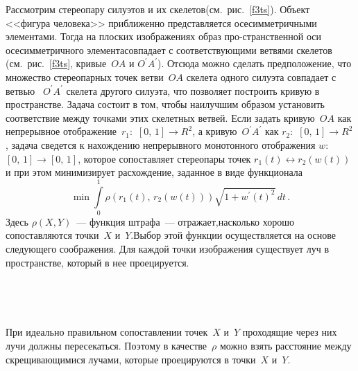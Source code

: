\begin{multicols}{2}
     Рассмотрим стереопару силуэтов и их скелетов\linebreak (см.\  рис.~\ref{f3ts}). 
Объект <<фигура человека>> прибли\-женно представляется осесимметричными 
элементами. Тогда на плоских изображениях образ про-\linebreak странственной оси 
осесимметричного элемента\linebreak совпадает с соответствующими ветвями скелетов 
(см.\ рис.~\ref{f3ts}, кривые~$OA$ и $O^\prime A^\prime$). Отсюда можно 
сделать предположение, что множество стереопарных точек ветви~$OA$ скелета 
одного силуэта совпадает с ветвью~ $O^\prime A^\prime$ скелета другого 
силуэта, что позволяет построить кривую в пространстве. Задача состоит в том, 
чтобы наилучшим образом установить соответствие между точками этих 
скелетных ветвей. Если задать кривую~$OA$ как непрерывное 
отображение~$r_1$:~$[0,\,1] \rightarrow R^2$, а кривую~$O^\prime A^\prime$ 
как $r_2$:~$[0,\,1] \rightarrow R^2$, задача сведется к на\-хож\-де\-нию 
непрерывного монотонного отображения $w$:~$[0,\,1] \rightarrow [0,\,1]$, 
которое сопоставляет стереопары точек $r_1(t) \leftrightarrow r_2(w(t))$ и при 
этом минимизирует расхождение, заданное в виде функционала
     $$
     \min \int\limits_0^1 \rho (r_1(t),\,r_2(w(t)))\sqrt{1+w^\prime(t)^2}\,dt\,.
     $$
          Здесь $\rho(X,Y)$~--- функция штрафа~--- отражает,\linebreak насколько хорошо 
сопоставляются точки~$X$ и~$Y$.\linebreak Выбор этой функции осуществляется на 
основе следующего соображения. Для каждой точки изоб\-ра\-же\-ния существует 
луч в пространстве, который в нее проецируется. 
\begin{figure*} %
\vspace*{1pt}
\begin{center}
\mbox{%
\epsfxsize=159.139mm
}
\end{center}
\vspace*{-6pt}
\end{figure*}
\begin{figure*}[b] %
\vspace*{1pt}
\begin{center}
\mbox{%
\epsfxsize=164.469mm
}
\end{center}
\vspace*{-6pt}
\end{figure*}
При идеально правильном 
сопоставлении точек~$X$ и~$Y$ проходящие через них лучи должны 
пересекаться. Поэтому в качестве~$\rho$ можно взять расстояние между 
скрещивающимися лучами, которые проецируются в точки~$X$ и~$Y$.
     

\end{multicols}

